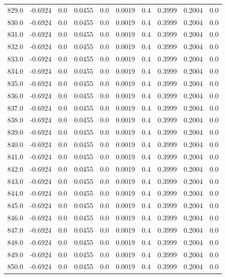 \begin{longtable}{lrrrrrrrrr}
829.0 & -0.6924 & 0.0 & 0.0455 & 0.0 & 0.0019 & 0.4 & 0.3999 & 0.2004 & 0.0 \\
830.0 & -0.6924 & 0.0 & 0.0455 & 0.0 & 0.0019 & 0.4 & 0.3999 & 0.2004 & 0.0 \\
831.0 & -0.6924 & 0.0 & 0.0455 & 0.0 & 0.0019 & 0.4 & 0.3999 & 0.2004 & 0.0 \\
832.0 & -0.6924 & 0.0 & 0.0455 & 0.0 & 0.0019 & 0.4 & 0.3999 & 0.2004 & 0.0 \\
833.0 & -0.6924 & 0.0 & 0.0455 & 0.0 & 0.0019 & 0.4 & 0.3999 & 0.2004 & 0.0 \\
834.0 & -0.6924 & 0.0 & 0.0455 & 0.0 & 0.0019 & 0.4 & 0.3999 & 0.2004 & 0.0 \\
835.0 & -0.6924 & 0.0 & 0.0455 & 0.0 & 0.0019 & 0.4 & 0.3999 & 0.2004 & 0.0 \\
836.0 & -0.6924 & 0.0 & 0.0455 & 0.0 & 0.0019 & 0.4 & 0.3999 & 0.2004 & 0.0 \\
837.0 & -0.6924 & 0.0 & 0.0455 & 0.0 & 0.0019 & 0.4 & 0.3999 & 0.2004 & 0.0 \\
838.0 & -0.6924 & 0.0 & 0.0455 & 0.0 & 0.0019 & 0.4 & 0.3999 & 0.2004 & 0.0 \\
839.0 & -0.6924 & 0.0 & 0.0455 & 0.0 & 0.0019 & 0.4 & 0.3999 & 0.2004 & 0.0 \\
840.0 & -0.6924 & 0.0 & 0.0455 & 0.0 & 0.0019 & 0.4 & 0.3999 & 0.2004 & 0.0 \\
841.0 & -0.6924 & 0.0 & 0.0455 & 0.0 & 0.0019 & 0.4 & 0.3999 & 0.2004 & 0.0 \\
842.0 & -0.6924 & 0.0 & 0.0455 & 0.0 & 0.0019 & 0.4 & 0.3999 & 0.2004 & 0.0 \\
843.0 & -0.6924 & 0.0 & 0.0455 & 0.0 & 0.0019 & 0.4 & 0.3999 & 0.2004 & 0.0 \\
844.0 & -0.6924 & 0.0 & 0.0455 & 0.0 & 0.0019 & 0.4 & 0.3999 & 0.2004 & 0.0 \\
845.0 & -0.6924 & 0.0 & 0.0455 & 0.0 & 0.0019 & 0.4 & 0.3999 & 0.2004 & 0.0 \\
846.0 & -0.6924 & 0.0 & 0.0455 & 0.0 & 0.0019 & 0.4 & 0.3999 & 0.2004 & 0.0 \\
847.0 & -0.6924 & 0.0 & 0.0455 & 0.0 & 0.0019 & 0.4 & 0.3999 & 0.2004 & 0.0 \\
848.0 & -0.6924 & 0.0 & 0.0455 & 0.0 & 0.0019 & 0.4 & 0.3999 & 0.2004 & 0.0 \\
849.0 & -0.6924 & 0.0 & 0.0455 & 0.0 & 0.0019 & 0.4 & 0.3999 & 0.2004 & 0.0 \\
850.0 & -0.6924 & 0.0 & 0.0455 & 0.0 & 0.0019 & 0.4 & 0.3999 & 0.2004 & 0.0 \\

\end{longtable}
